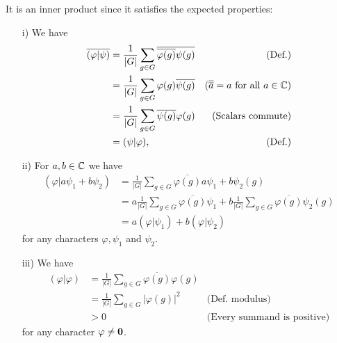 It is an inner product since it satisfies the expected properties:
\begin{enumerate}
	\item[i)] We have 
	\begin{align*}
		\overline{(\varphi|\psi)} &= \frac{1}{|G|} \sum_{g \in G} \overline{\overline{\varphi(g)} {\psi(g)}} & \text{(Def.)}\\
		&= \frac{1}{|G|} \sum_{g \in G} \varphi(g) \overline{\psi(g)} & \text{($\overline{\overline{a}}=a$ for all $a \in \mathbb{C}$)}\\
		&= \frac{1}{|G|} \sum_{g \in G} \overline{\psi(g)} {\varphi(g)} & \text{(Scalars commute)}\\
		&= (\psi|\varphi), &\text{(Def.)}
	\end{align*}
	\item[ii)] For $a,b \in \mathbb{C}$ we have 
	\begin{align*}
		(\varphi | a\psi_1 + b\psi_2) &= \frac{1}{|G|} \sum_{g \in G} \overline{\varphi(g)} {a\psi_1 + b\psi_2(g)} \\
		&= a\frac{1}{|G|} \sum_{g \in G} \overline{\varphi(g)} {\psi_1}  +b \frac{1}{|G|} \sum_{g \in G} \overline{\varphi(g)} {\psi_2(g)}  \\
		&= a(\varphi | \psi_1 )  +b (\varphi |\psi_2) 
	\end{align*}
	for any characters $\varphi, \psi_1$ and $\psi_2$.
	\item[iii)] We have 
	\begin{align*}
		(\varphi|\varphi) &= \frac{1}{|G|} \sum_{g \in G} \overline{\varphi(g)} {\varphi(g)} \\
		&= \frac{1}{|G|} \sum_{g \in G} |\varphi(g)|^2 & \text{(Def. modulus)}\\
		&> 0 & \text{(Every summand is positive)}
	\end{align*}
	for any character $\varphi \neq \mathbf{0}$.
\end{enumerate}


